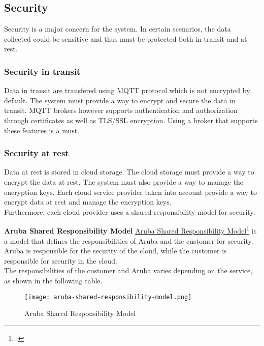 \subsection{Security}
Security is a major concern for the system. In certain scenarios, the data collected could be sensitive and thus must be protected both in transit and at rest.
    \subsubsection{Security in transit}
    Data in transit are transfered using MQTT protocol which is not encrypted by default. The system must provide a way to encrypt and secure the data in transit. MQTT brokers however supports authentication and authorization through certificates as well as TLS/SSL encryption. Using a broker that supports these features is a must.
    
    \subsubsection{Security at rest}
    Data at rest is stored in cloud storage. The cloud storage must provide a way to encrypt the data at rest. The system must also provide a way to manage the encryption keys. Each cloud service provider taken into account provide a way to encrypt data at rest and manage the encryption keys.\\ 
    Furthermore, each cloud provider uses a shared responsibility model for security.
    
    \newpage
    \textbf{Aruba Shared Responsibility Model}
    \href{https://kb.arubacloud.com/en/computing/use-and-technology/shared-responsibility-model.aspx}{Aruba Shared Responsibility Model}\footcite{site:aruba-shared-responsibility-model} is a model that defines the responsibilities of Aruba and the customer for security. Aruba is responsible for the security of the cloud, while the customer is responsible for security in the cloud.\\ The responsibilities of the customer and Aruba varies depending on the service, as shown in the following table.\\ 
    \begin{figure}[htbp]
        \centering
        \texttt{[image: aruba-shared-responsibility-model.png]}
        \caption{Aruba Shared Responsibility Model}
    \end{figure}

